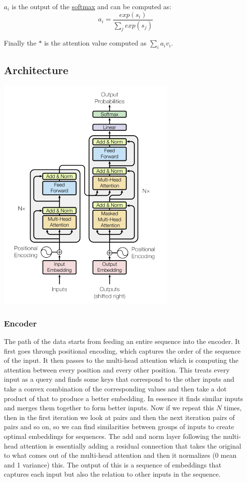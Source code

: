 \documentclass[12pt]{article}
\begin{document}
        $a_i$ is the output of the \hyperref[sec:Softmax]{softmax} and can be computed as:
        $$ a_i = \frac{exp(s_i)}{\sum_j exp(s_j)} $$

        Finally the $*$ is the attention value computed as $\sum_i a_i v_i$.

    \subsection{Architecture}
        \begin{center}
            \includegraphics[scale=0.55]{Transformer}    
        \end{center}

        \subsubsection{Encoder}
            The path of the data starts from feeding an entire sequence into the encoder. It first goes through
            positional encoding, which captures the order of the sequence of the input. It then passes to the multi-head
            attention which is computing the attention between every position and every other position. This treats
            every input as a query and finds some keys that correspond to the other inputs and take a convex combination
            of the corresponding values and then take a dot product of that to produce a better embedding. In essence it
            finds similar inputs and merges them together to form better inputs. Now if we repeat this $N$ times, then
            in the first iteration we look at pairs and then the next iteration pairs of pairs and so on, so we can find
            similarities between groups of inputs to create optimal embeddings for sequences. The add and norm layer
            following the multi-head attention is essentially adding a residual connection that takes the original to
            what comes out of the multi-head attention and then it normalizes (0 mean and 1 variance) this. The
            output of this is a sequence of embeddings that captures each input but also the relation to other inputs in
            the sequence.
        
\end{document}
